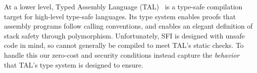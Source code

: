 At a lower level, Typed Assembly Language (TAL)~\cite{morrisett_system_1999,
morrisett_stack-based_2002, morrisett_talx86_1999} is a type-safe compilation
target for high-level type-safe languages.
%
Its type system enables proofs that assembly programs follow
calling conventions, and enables an elegant definition of stack safety through
polymorphism.
%
Unfortunately, SFI is designed with unsafe code in mind, so cannot generally be
compiled to meet TAL's static checks.
%
To handle this our zero-cost and security conditions instead capture the \emph{behavior} that
TAL's type system is designed to ensure.